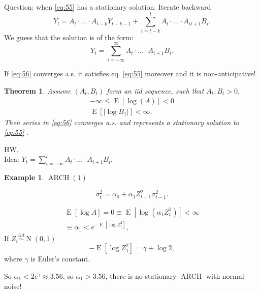 \documentclass[12pt,a4paper, notitlepage]{book}
\theoremstyle{definition} %
\newtheorem{example}{Example}[chapter]
\theoremstyle{plain} %
\newtheorem{theorem}{Theorem}
\DeclareMathOperator{\E}{E}
\DeclareMathOperator{\No}{N}
\DeclareMathOperator{\Arch}{ARCH}
\begin{document}
Question: when \ref{eq:55} has a stationary solution. Iterate backward
\[ Y_t = A_t \cdot \ldots \cdot A_{t-k} Y_{t-k-1} + \sum _{i=t-k}^t A_t \cdot \ldots \cdot A_{it+1}B_i . \]
We guess that the solution is of the form:
\[ Y_t = \sum _{i = - \infty}^{\infty} A_t \cdot \ldots \cdot A_{i + 1} B_i  . \label{eq:56} \]

If \ref{eq:56} converges a.s. it satisfies eq. \ref{eq:55} moreover and it is 
non-anticipative! 


\begin{theorem} Assume $ (A_t, B_t) $ form an iid sequence, such that $ A_t, B_t > 0,$
\begin{align*} 
- \infty \leq \E[ \log(A)] < 0 \\
\E[ |\log B_1|] < \infty .
\end{align*}
Then series in \ref{eq:56} converges a.s. and represents a stationary solution to \ref{eq:55} .
\end{theorem}
\proof HW, 
\\
Idea: $ Y_t = \sum_{i = - \infty}^t A_t \cdot \ldots \cdot A_{i+1} B_i . $ %
\endproof


\begin{example}  $ \Arch(1) $

\[ \sigma_t ^2 = \alpha_0 + \alpha_1 Z_{t-1}^2 \sigma_{t-1}^2 .\]

\begin{align*}
 \E[ \log A] = 0 \equiv \E[\log(\alpha_1 Z_t^2)] < \infty \\
\equiv \alpha_1 < e^{ - \E[\log Z_1^2] }  ,
\end{align*}
If $ Z_i \overset{iid}{\sim} \No(0,1) $
\[ - \E[\log Z_1^2] = \gamma + \log 2 , \]
where $ \gamma $ is Euler's constant.

So $ \alpha _1 < 2 e^{\gamma} \approx 3.56 $, so $ \alpha_1 > 3.56 $, there is no stationary $ \Arch $ with normal noise!

\end{example}
\end{document}
